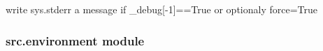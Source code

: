 \documentclass[a4paper,10pt,english]{sphinxmanual}
\begin{document}

\begin{fulllineitems}
\label{commands/apidoc/src:src.debug.write}
write sys.stderr a message if \_debug{[}-1{]}==True or optionaly force=True

\end{fulllineitems}



\subsubsection{src.environment module}
\label{commands/apidoc/src:src-environment-module}\label{commands/apidoc/src:module-src.environment}
\end{document}
